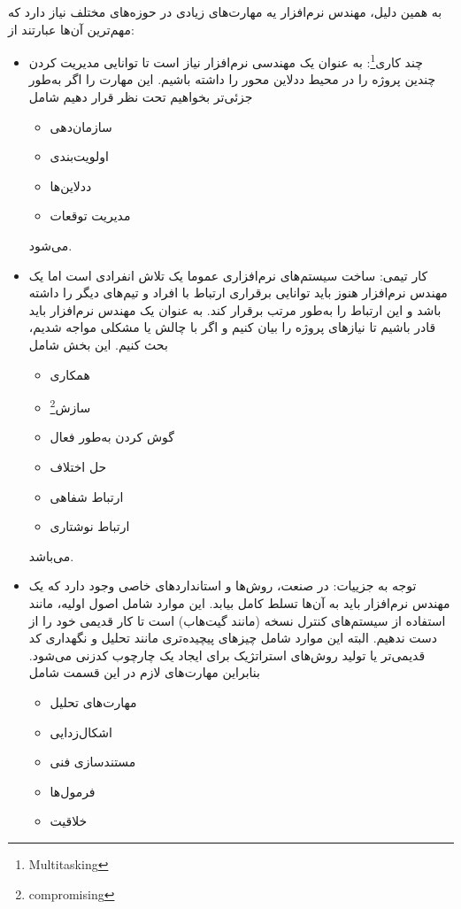\begin{itemize}
به همین دلیل، مهندس نرم‌افزار یه مهارت‌های زیادی در حوزه‌های مختلف نیاز دارد که مهم‌ترین ‌آن‌ها عبارتند از:
	\begin{itemize}
		\item
چند کاری\footnote{Multitasking}: به عنوان یک مهندسی نرم‌افزار نیاز است تا توانایی مدیریت کردن چندین پروژه را در محیط ددلاین محور را داشته باشیم. این مهارت‌ را اگر به‌طور جزئی‌تر بخواهیم تحت نظر قرار دهیم شامل 
		\begin{itemize}
			\item سازمان‌دهی
			\item اولویت‌بندی
			\item ددلاین‌ها
			\item مدیریت توقعات
		\end{itemize}
	می‌شود. 
	\item کار تیمی:
	ساخت سیستم‌های نرم‌افزاری عموما یک تلاش انفرادی است اما یک مهندس نرم‌افزار هنوز باید توانایی برقراری ارتباط با افراد و تیم‌های دیگر را داشته باشد و این ارتباط را به‌طور مرتب برقرار کند. به عنوان یک مهندس نرم‌افزار باید قادر باشیم تا نیازهای پروژه را بیان کنیم و اگر با چالش یا مشکلی مواجه شدیم، بحث کنیم. این بخش شامل 
		\begin{itemize}
			\item همکاری
			\item سازش\footnote{compromising}
			\item گوش کردن به‌طور فعال
			\item حل اختلاف
			\item ارتباط شفاهی
			\item ارتباط نوشتاری
		\end{itemize}
			می‌باشد.
	\end{itemize}
	\begin{itemize}
		\item 		توجه به جزییات:
		در صنعت، روش‌ها و استانداردهای خاصی وجود دارد که یک مهندس نرم‌افزار باید به آن‌ها تسلط کامل بیابد. این موارد شامل اصول اولیه، مانند استفاده از سیستم‌های کنترل نسخه (مانند گیت‌هاب) است تا کار قدیمی خود را از دست ندهیم. البته این موارد شامل چیزهای پیچیده‌تری مانند تحلیل و نگهداری کد قدیمی‌تر یا تولید روش‌های استراتژیک برای ایجاد یک چارچوب کدزنی می‌شود. بنابراین مهارت‌های لازم در این قسمت شامل
		\begin{itemize}
			\item مهارت‌های تحلیل
			\item اشکال‌زدایی
			\item مستندسازی فنی
			\item فرمول‌ها
			\item خلاقیت

\end{itemize}
\end{itemize}
\end{itemize}
